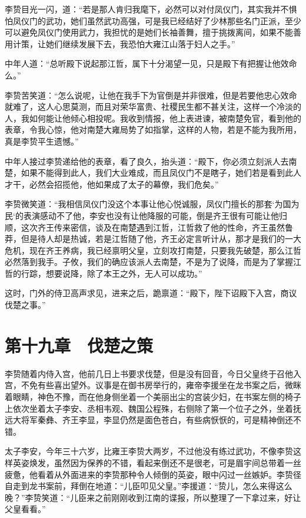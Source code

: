 李贽目光一闪，道：“若是那人肯归我麾下，必然可以对付凤仪门，其实我并不惧怕凤仪门的武功，她们虽然武功高强，可是我已经结好了少林那些名门正派，至少可以避免凤仪门使用武力，我担忧的是她们长袖善舞，擅于挑拨离间，如果不能善用计策，让她们继续发展下去，我恐怕大雍江山落于妇人之手。”

中年人道：“总听殿下说起那江哲，属下十分渴望一见，只是殿下有把握让他效命么。”

李贽苦笑道：“怎么说呢，让他在我手下为官倒是并非很难，但是若要他忠心效命就难了，这人心思莫测，而且对荣华富贵、社稷民生都不甚关注，这样一个冷淡的人，我如何能让他倾心相投呢。我收到情报，他上表进谏，被南楚免官，看到他的表章，令我心惊，他对南楚大雍局势了如指掌，这样的人物，若是不能为我所用，真是李贽平生遗憾。”

中年人接过李贽递给他的表章，看了良久，抬头道：“殿下，你必须立刻派人去南楚，如果不能得到此人，我们大业难成，而且凤仪门不是瞎子，她们若是看到此人才干，必然会招揽他，他如果成了太子的幕僚，我们危矣。”

李贽微笑道：“我相信凤仪门没这个本事让他心悦诚服，凤仪门擅长的那套‘为国为民‘的表演感动不了他，李安也没有让他降服的可能，倒是齐王很有可能让他归顺，这次齐王传来密信，谈及在南楚遇到江哲，江哲救了他的性命，齐王虽然鲁莽，但是待人却是热诚，若是江哲随了他，齐王必定言听计从，那才是我们的一大危机，现在齐王养病，我已经禀明父皇，立刻攻打南楚，只要我先破楚，那么江哲必然落到我手。子攸，我们的确应该派人去南楚，不是为了说降，而是为了掌握江哲的行踪，想要说降，除了本王之外，无人可以成功。”

这时，门外的侍卫高声求见，进来之后，跪禀道：“殿下，陛下诏殿下入宫，商议伐楚之事。”

\chapter{第十九章　伐楚之策}

李贽随着内侍入宫，他前几日上书要求伐楚，但是没有回音，今日父皇终于召他入宫，不免有些喜出望外。议事是在御书房举行的，雍帝李援坐在龙书案之后，微眯着眼睛，神色不豫，而在他身侧坐着一个美丽出尘的宫装少妇，在书案左侧的椅子上依次坐着太子李安、丞相韦观、魏国公程殊，右侧除了第一个位子之外，坐着抚远大将军秦彝、齐王李显，李显仍然是面色苍白，有些病恹恹的，可是精神倒还不错。

太子李安，今年三十六岁，比雍王李贽大两岁，不过他没有练过武功，不像李贽这样英姿焕发，虽然因为保养的不错，看起来倒还不是很老，可是眉宇间总带着一丝疲惫，他看着从外面进来的李贽那种令人倾倒的英姿，眼中闪过一丝嫉妒。李贽径自走到龙书案前，拜倒在地道：“儿臣叩见父皇。”李援道：“贽儿，怎么来得这么晚？”李贽笑道：“儿臣来之前刚刚收到江南的谍报，所以整理了一下拿过来，好让父皇看看。”

